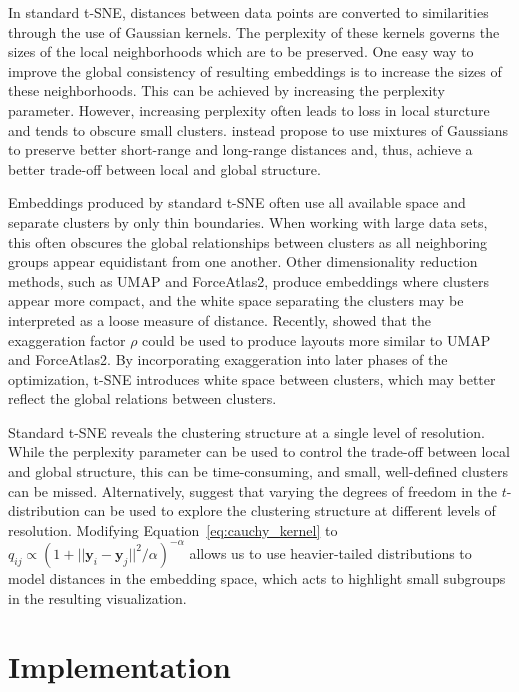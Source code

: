 \documentclass[article]{jss}
\begin{document}
In standard t-SNE, distances between data points are converted to similarities
through the use of Gaussian kernels. The perplexity of these kernels governs the
sizes of the local neighborhoods which are to be preserved. One easy way to
improve the global consistency of resulting embeddings is to increase the sizes
of these neighborhoods. This can be achieved by increasing the perplexity
parameter. However, increasing perplexity often leads to loss in local sturcture
and tends to obscure small clusters. \citet{kobak2019art} instead propose to use
mixtures of Gaussians to preserve better short-range and long-range distances
and, thus, achieve a better trade-off between local and global structure.

Embeddings produced by standard t-SNE often use all available space and separate
clusters by only thin boundaries. When working with large data sets, this often
obscures the global relationships between clusters as all neighboring groups
appear equidistant from one another.  Other dimensionality reduction methods,
such as UMAP and ForceAtlas2, produce embeddings where clusters appear more
compact, and the white space separating the clusters may be interpreted as a
loose measure of distance. Recently, \citet{bohm2020unifying} showed that the
exaggeration factor $\rho$ could be used to produce layouts more similar to UMAP
and ForceAtlas2. By incorporating exaggeration into later phases of the
optimization, t-SNE introduces white space between clusters, which may better
reflect the global relations between clusters.

Standard t-SNE reveals the clustering structure at a single level of resolution.
While the perplexity parameter can be used to control the trade-off between
local and global structure, this can be time-consuming, and small, well-defined
clusters can be missed. Alternatively, \citet{kobak2019heavy} suggest that
varying the degrees of freedom in the $t$-distribution can be used to explore
the clustering structure at different levels of resolution. Modifying
Equation~\ref{eq:cauchy_kernel} to $q_{ij} \propto \left ( 1 + || \mathbf{y}_i -
\mathbf{y}_j ||^2 / \alpha \right )^{-\alpha}$ allows us to use heavier-tailed
distributions to model distances in the embedding space, which acts to highlight
small subgroups in the resulting visualization.


\section{Implementation} \label{sec:implementation}
\end{document}
